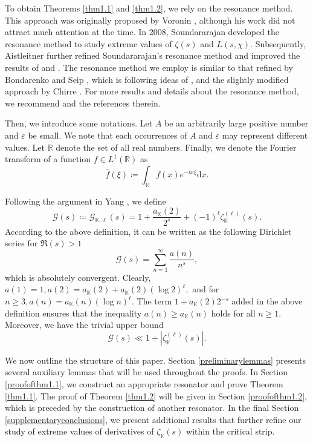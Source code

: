 \documentclass[12pt,reqno]{amsart}
\theoremstyle{definition}
\numberwithin{equation}{section}
\newcommand{\mbk}{\mathbb{K}}
\newcommand{\mbr}{\mathbb{R}}
\newcommand{\mcg}{\mathcal{G}}
\begin{document}
To obtain Theorems \ref{thm1.1} and \ref{thm1.2}, we rely on the resonance method. This approach was originally proposed by Voronin \cite{voronin1988lower}, although his work did not attract much attention at the time. In 2008, Soundararajan \cite{soundararajan2008extreme} developed the resonance method to study extreme values of $\zeta(s)$ and $L(s, \chi)$. Subsequently, Aistleitner \cite{aistleitner2016lower} further refined Soundararajan's resonance method and improved the results of \cite{voronin1988lower} and \cite{hilberdink2009arithmetical}. The resonance method we employ is similar to that refined by Bondarenko and Seip \cite{bondarenko2017large,bondarenko2018argument}, which is following ideas of \cite{aistleitner2016lower}, and the slightly modified approach by Chirre \cite{chirre2019extreme}. For more results and details about the resonance method, we recommend \cite{aistleitner2019extreme,dong2023Onde,xumax2024extreme,qiyu2024large} and the references therein.
\par
Then, we introduce some notations. Let $A$ be an arbitrarily large positive number and $\varepsilon$ be small. We note that each occurrences of $A$ and $\varepsilon$ may represent different values. Let $\mbr$ denote the set of all real numbers. Finally, we denote the Fourier transform of a function $f \in L^1(\mbr)$ as
$$\widehat{f}(\xi)\coloneqq \int_\mbr f(x) e^{-i x \xi} \mathrm{d}x.$$ 
\par
Following the argument in Yang \cite[p.4]{yang2022extreme}, we define
$$
\mcg(s) \coloneqq \mcg_{\mbk,\ell}(s) = 1 + \frac{a_{\mbk}(2)}{2^s} + (-1)^{\ell} \zeta_{\mbk}^{(\ell)}(s).
$$
According to the above definition, it can be written as the following Dirichlet series for $\Re(s) > 1$
\begin{equation}
    \label{Gdefinition}
    \mcg(s) = \sum_{n = 1}^{\infty} \frac{a(n)}{n^s},
\end{equation}
which is absolutely convergent. Clearly, $a(1)=1, a(2) = a_\mbk(2)+a_\mbk(2) (\log 2)^{\ell},$ and for $n \ge3,a(n)=a_\mbk(n)(\log n)^{\ell}.$ The term $1 + a_{\mbk}(2) 2^{-s}$ added in the above definition ensures that the inequality $a(n) \ge a_\mbk(n)$ holds for all $n \ge 1$. Moreover, we have the trivial upper bound
\begin{equation}
    \label{tirvialupper}
    \mcg(s) \ll 1 + |\zeta_\mbk^{(\ell)}(s)|.
\end{equation}
\par
We now outline the structure of this paper. Section \ref{preliminarylemmas} presents several auxiliary lemmas that will be used throughout the proofs. In Section \ref{proofofthm1.1}, we construct an appropriate resonator and prove Theorem \ref{thm1.1}. The proof of Theorem \ref{thm1.2} will be given in Section \ref{proofofthm1.2}, which is preceded by the construction of another resonator. In the final Section \ref{supplementaryconclusions}, we present additional results that further refine our study of extreme values of derivatives of $\zeta_\mbk(s)$ within the critical strip.
\end{document}
